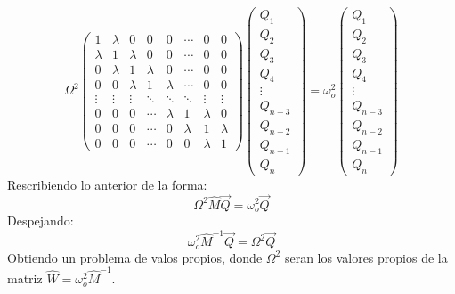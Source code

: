 \documentclass[11pt,letterpaper,twocolumn]{article}
\begin{document}
{\fontsize{7}{15}\selectfont
$$ \Omega^{2} \left(
\begin{matrix}
1 & \lambda  & 0 & 0 & 0 & \cdots & 0 & 0 \\
\lambda & 1 & \lambda  & 0 & 0 & \cdots & 0 & 0\\
0 & \lambda  & 1 & \lambda   & 0 & \cdots & 0& 0 \\
0 & 0 & \lambda  & 1 & \lambda   & \cdots & 0 & 0 \\
\vdots & \vdots & \vdots & \ddots & \ddots & \ddots & \vdots & \vdots \\
0 & 0 & 0 & \cdots & \lambda  &  1 & \lambda &0\\    
0 & 0 & 0 & \cdots & 0 & \lambda  & 1 & \lambda\\    
0 & 0 & 0 & \cdots & 0 & 0 & \lambda  & 1    
\end{matrix} \right) \left(
\begin{matrix}
Q_{1}\\
Q_{2}\\
Q_{3}\\
Q_{4}\\
\vdots\\
Q_{n-3}\\
Q_{n-2}\\
Q_{n-1}\\
Q_{n}
\end{matrix} \right) =\omega_{o}^{2} \left(
\begin{matrix}
Q_{1}\\
Q_{2}\\
Q_{3}\\
Q_{4}\\
\vdots\\
Q_{n-3}\\
Q_{n-2}\\
Q_{n-1}\\
Q_{n}
\end{matrix} \right)
$$}
Rescribiendo lo anterior de la forma: 
$$\Omega^{2} \hat{M} \vec{Q} = \omega_{o}^{2} \vec{Q}$$
Despejando: 
\begin{equation}
\omega_{o}^{2} \hat{M}^{-1} \vec{Q}=\Omega^{2} \vec{Q}
\end{equation}
Obtiendo un problema de valos propios, donde $\Omega^{2}$ seran los valores propios de la matriz $\hat{W}=\omega_{o}^{2} \hat{M}^{-1}$. 
\end{document}
